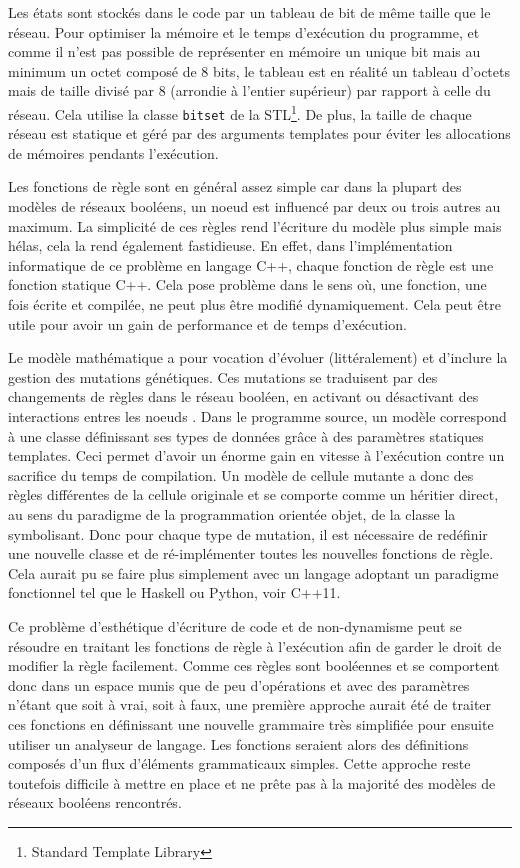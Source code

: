 \documentclass[11pt, a4paper]{article}
\begin{document}
Les états sont stockés dans le code par un tableau de bit de même taille que le
réseau. Pour optimiser la mémoire et le temps d'exécution du programme, et
comme il n'est pas possible de représenter en mémoire un unique bit mais au
minimum un octet composé de 8 bits, le tableau est en réalité un tableau
d'octets mais de taille divisé par 8 (arrondie à l'entier supérieur) par
rapport à celle du réseau. Cela utilise la classe \texttt{bitset} de la
STL\footnote{Standard Template Library}. De plus, la taille de chaque réseau
est statique et géré par des arguments templates pour éviter les allocations de
mémoires pendants l'exécution.

Les fonctions de règle sont en général assez simple car dans la plupart des
modèles de réseaux booléens, un noeud est influencé par deux ou trois autres au
maximum. La simplicité de ces règles rend l'écriture du modèle plus simple mais
hélas, cela la rend également fastidieuse.  En effet, dans l'implémentation
informatique de ce problème en langage C++, chaque fonction de règle
est une fonction statique C++. Cela pose problème dans le sens où, une
fonction, une fois écrite et compilée, ne peut plus être modifié dynamiquement.
Cela peut être utile pour avoir un gain de performance et de temps d'exécution.

Le modèle math\'ematique a pour vocation d'évoluer (litt\'eralement) et d'inclure la gestion des mutations
g\'en\'etiques. Ces mutations se traduisent par des changements de règles dans le
réseau booléen, en activant ou désactivant des interactions entres les noeuds
\cite{calzone2010}.  Dans le programme source, un modèle correspond à une
classe définissant ses types de données grâce à des paramètres statiques
templates. Ceci permet d'avoir un énorme gain en vitesse à l'exécution contre un
sacrifice du temps de compilation.  Un modèle de cellule mutante a donc
des règles diff\'erentes de la cellule originale et se comporte comme un héritier
direct, au sens du paradigme de la programmation orientée objet, de la classe
la symbolisant.  Donc pour chaque type de mutation, il est nécessaire de
redéfinir une nouvelle classe et de ré-implémenter toutes les nouvelles
fonctions de règle. Cela aurait pu se faire plus simplement avec un langage
adoptant un paradigme fonctionnel tel que le Haskell ou Python, voir C++11.

Ce problème d'esthétique d'écriture de code et de non-dynamisme peut se
résoudre en traitant les fonctions de règle à l'exécution afin de garder le
droit de modifier la règle facilement. Comme ces règles sont booléennes et se
comportent donc dans un espace munis que de peu d'opérations et avec des
paramètres n'étant que soit à vrai, soit à faux, une première approche aurait
été de traiter ces fonctions en définissant une nouvelle grammaire très
simplifiée pour ensuite utiliser un analyseur de langage.  Les fonctions
seraient alors des définitions composés d'un flux d'éléments grammaticaux
simples. Cette approche reste toutefois difficile à mettre en place et ne prête
pas à la majorité des modèles de réseaux booléens rencontrés.
\end{document}
